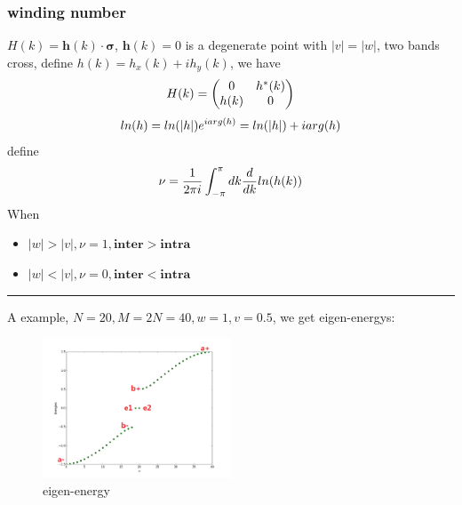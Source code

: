 \documentclass[letterpaper,10pt,english]{sphinxmanual}
\begin{document}
\subsubsection{winding number}
\label{TI/Lecture notes/1:winding-number}
\(H(k)=\mathbf{h}(k)\cdot \mathbf{\sigma}\), \(\mathbf{h}(k)=0\) is a
degenerate point with \(|v|=|w|\), two bands cross, define
\(h(k)=h_x(k)+ih_y(k)\), we have
\begin{gather}
\begin{split}H(k)=\begin{pmatrix}0&h^*(k)\\h(k)&0\end{pmatrix}\end{split}\notag
\end{gather}\begin{gather}
\begin{split}ln(h)=ln(|h|)e^{iarg(h)}=ln(|h|)+iarg(h)\end{split}\notag
\end{gather}
define
\begin{gather}
\begin{split}\nu=\frac{1}{2\pi i}\int_{-\pi}^{\pi}dk\frac{d}{dk}ln(h(k))\end{split}\notag
\end{gather}
When
\begin{itemize}
\item {}
\(|w|>|v|, \nu=1, \mathbf{inter}>\mathbf{intra}\)

\item {}
\(|w|<|v|, \nu=0, \mathbf{inter}<\mathbf{intra}\)

\end{itemize}


\bigskip\hrule{}\bigskip


A example, \(N=20, M=2N=40, w=1, v=0.5\), we get eigen-energys:
\begin{figure}[htbp]
\centering
\capstart

\includegraphics[width=0.5\textwidth]{4.png}
\caption{eigen-energy}\end{figure}
\end{document}
